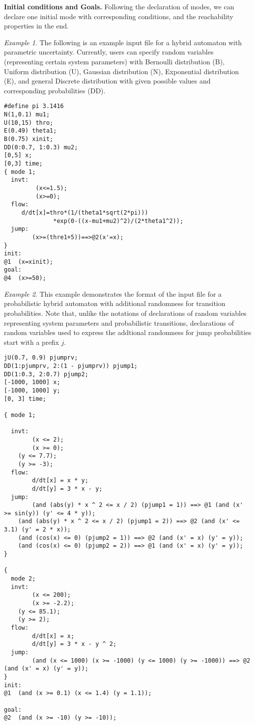{\bf Initial conditions and Goals.} Following the declaration of modes, we can declare one initial mode with corresponding conditions, and the reachability properties in the end.

\noindent\textit{Example 1}. The following is an example input file for a hybrid automaton with parametric uncertainty. Currently, users can specify random variables (representing certain system parameters) with Bernoulli distribution (B), Uniform distribution (U), Gaussian distribution (N), Exponential distribution (E), and general Discrete distribution with given possible values and corresponding probabilities (DD). 
\lstset{basicstyle=\ttfamily\small, numbers=left, breaklines=true }
\begin{lstlisting}
#define pi 3.1416
N(1,0.1) mu1;
U(10,15) thro;
E(0.49) theta1;
B(0.75) xinit;
DD(0:0.7, 1:0.3) mu2;
[0,5] x;
[0,3] time;
{ mode 1; 
  invt:
         (x<=1.5);
         (x>=0);
  flow:
	 d/dt[x]=thro*(1/(theta1*sqrt(2*pi)))
	          *exp(0-((x-mu1+mu2)^2)/(2*theta1^2));
  jump:
        (x>=(thre1+5))==>@2(x'=x);
}
init:
@1	(x=xinit);
goal:
@4	(x>=50);
\end{lstlisting}

\noindent\textit{Example 2}.  This example demonstrates the format of the input file for a probabilistic hybrid automaton with additional randomness for transition probabilities. Note that, unlike the notations of declarations of random variables representing system parameters and probabilistic transitions, declarations of random variables used to express the addtional randomness for jump probabilities start with a prefix $j$.
\lstset{basicstyle=\ttfamily\small, numbers=left, breaklines=true }
\begin{lstlisting}
jU(0.7, 0.9) pjumprv;
DD(1:pjumprv, 2:(1 - pjumprv)) pjump1;
DD(1:0.3, 2:0.7) pjump2;
[-1000, 1000] x;
[-1000, 1000] y;
[0, 3] time;

{ mode 1;

  invt:
        (x <= 2);
        (x >= 0);
	(y <= 7.7);
	(y >= -3);
  flow:
        d/dt[x] = x * y;
        d/dt[y] = 3 * x - y;
  jump:
        (and (abs(y) * x ^ 2 <= x / 2) (pjump1 = 1)) ==> @1 (and (x' >= sin(y)) (y' <= 4 * y));
	(and (abs(y) * x ^ 2 <= x / 2) (pjump1 = 2)) ==> @2 (and (x' <= 3.1) (y' = 2 * x));
	(and (cos(x) <= 0) (pjump2 = 1)) ==> @2 (and (x' = x) (y' = y));
	(and (cos(x) <= 0) (pjump2 = 2)) ==> @1 (and (x' = x) (y' = y));
}

{
  mode 2;
  invt:
        (x <= 200);
        (x >= -2.2);
	(y <= 85.1);
	(y >= 2);
  flow:
        d/dt[x] = x;
        d/dt[y] = 3 * x - y ^ 2;
  jump:
        (and (x <= 1000) (x >= -1000) (y <= 1000) (y >= -1000)) ==> @2 (and (x' = x) (y' = y));
}
init:
@1	(and (x >= 0.1) (x <= 1.4) (y = 1.1));

goal:
@2	(and (x >= -10) (y >= -10));
\end{lstlisting}


